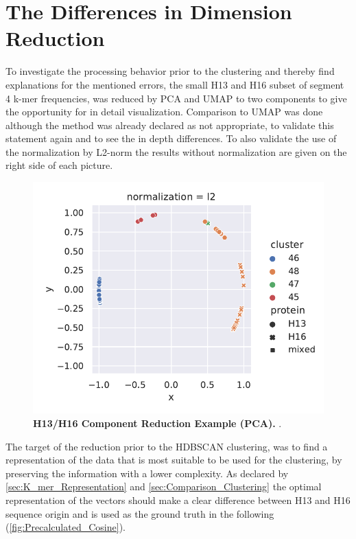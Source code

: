 \section{The Differences in Dimension Reduction} \label{sec:Dimension_Reduction}

To investigate the processing behavior prior to the clustering and thereby find explanations for the mentioned errors, the small H13 and H16 subset of segment 4 k-mer frequencies, was reduced by \gls{PCA} and \gls{UMAP} to two components to give the opportunity for in detail visualization. Comparison to \gls{UMAP} was done although the method was already declared as not appropriate, to validate this statement again and to see the in depth differences. %
To also validate the use of the normalization by L2-norm the results without normalization are given on the right side of each picture.

\begin{figure}[!hbt]
    \centering
    \includegraphics[width=\textwidth]{PCA/Difference_Segment_4_H_PCA.pdf}
    \caption[H13/H16 Component Reduction Example (\Acrshort{PCA})]{\textbf{H13/H16 Component Reduction Example (\Acrshort{PCA}).} .}
    \label{fig:Reduction_Example_PCA}
\end{figure}

The target of the reduction prior to the \gls{HDBSCAN} clustering, was to find a representation of the data that is most suitable to be used for the clustering, by preserving the information with a lower complexity. As declared by \autoref{sec:K_mer_Representation} and \autoref{sec:Comparison_Clustering} the optimal representation of the vectors should make a clear difference between H13 and H16 sequence origin and is used as the ground truth in the following (\autoref{fig:Precalculated_Cosine}). 

